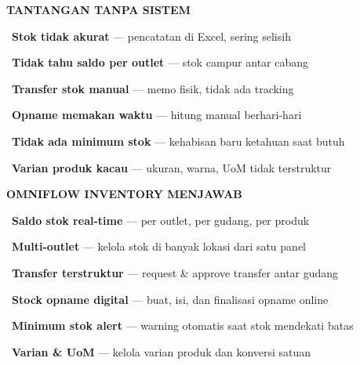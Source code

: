 \documentclass[a4paper]{article}
\begin{document}
\noindent
\begin{minipage}[t]{0.485\textwidth}
    \colorbox{RedLight}{%
        \begin{minipage}{\dimexpr\textwidth-2\fboxsep\relax}
            {\fontsize{10}{13}\selectfont\bfseries\color{RedText} TANTANGAN TANPA SISTEM}
        \end{minipage}}\par
    \vspace{4pt}

    {\fontsize{9.5}{13}\selectfont\color{TextDark}%
    \textbullet\ \textbf{Stok tidak akurat} --- pencatatan di Excel, sering selisih\par\vspace{4pt}%
    \textbullet\ \textbf{Tidak tahu saldo per outlet} --- stok campur antar cabang\par\vspace{4pt}%
    \textbullet\ \textbf{Transfer stok manual} --- memo fisik, tidak ada tracking\par\vspace{4pt}%
    \textbullet\ \textbf{Opname memakan waktu} --- hitung manual berhari-hari\par\vspace{4pt}%
    \textbullet\ \textbf{Tidak ada minimum stok} --- kehabisan baru ketahuan saat butuh\par\vspace{4pt}%
    \textbullet\ \textbf{Varian produk kacau} --- ukuran, warna, UoM tidak terstruktur}%
\end{minipage}%
\hfill%
\begin{minipage}[t]{0.485\textwidth}
    \colorbox{CyanPrimary}{%
        \begin{minipage}{\dimexpr\textwidth-2\fboxsep\relax}
            {\fontsize{10}{13}\selectfont\bfseries\color{White} OMNIFLOW INVENTORY MENJAWAB}
        \end{minipage}}\par
    \vspace{4pt}

    {\fontsize{9.5}{13}\selectfont\color{TextDark}%
    \textbullet\ \textbf{Saldo stok real-time} --- per outlet, per gudang, per produk\par\vspace{4pt}%
    \textbullet\ \textbf{Multi-outlet} --- kelola stok di banyak lokasi dari satu panel\par\vspace{4pt}%
    \textbullet\ \textbf{Transfer terstruktur} --- request \& approve transfer antar gudang\par\vspace{4pt}%
    \textbullet\ \textbf{Stock opname digital} --- buat, isi, dan finalisasi opname online\par\vspace{4pt}%
    \textbullet\ \textbf{Minimum stok alert} --- warning otomatis saat stok mendekati batas\par\vspace{4pt}%
    \textbullet\ \textbf{Varian \& UoM} --- kelola varian produk dan konversi satuan}%
\end{minipage}
\end{document}
